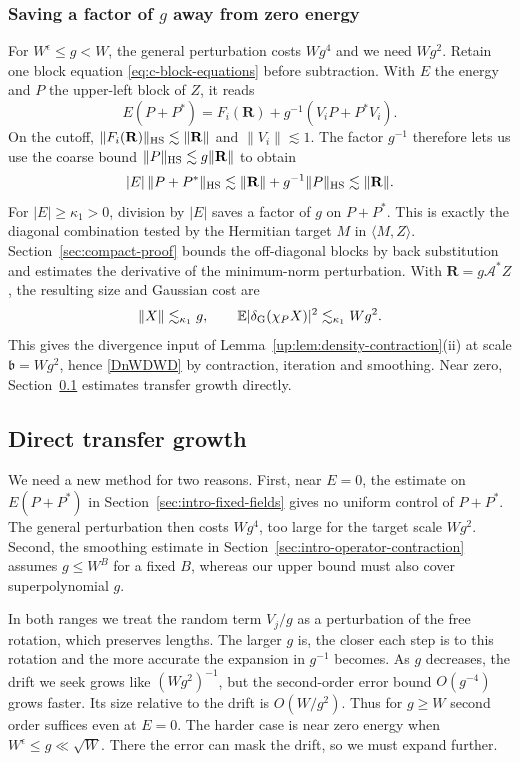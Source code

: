 \documentclass[11pt]{article}
\numberwithin{equation}{section}
\theoremstyle{remark}
\newcommand{\E}{\mathbb E}
\begin{document}
\subsubsection{Saving a factor of \texorpdfstring{$g$}{g} away from zero energy}

For $W^\epsilon\le g<W$, the general perturbation costs $Wg^4$ and we
need $Wg^2$. Retain one block equation \eqref{eq:c-block-equations}
before subtraction. With $E$ the energy and $P$ the upper-left block
of $Z$, it reads
\[
 E(P+P^*)=F_i(\mathbf R)+g^{-1}(V_iP+P^*V_i).
\]
On the cutoff, $\|F_i(\mathbf R)\|_{\rm HS}\lesssim\|\mathbf R\|$ and
$\|V_i\|\lesssim1$. The factor $g^{-1}$ therefore lets us use the
coarse bound $\|P\|_{\rm HS}\lesssim g\|\mathbf R\|$ to obtain
\[
 |E|\,\|P+P^*\|_{\rm HS}
 \lesssim \|\mathbf R\|+g^{-1}\|P\|_{\rm HS}
 \lesssim \|\mathbf R\|.
\]
For $|E|\ge\kappa_1>0$, division by $|E|$ saves a factor of $g$ on
$P+P^*$. This is exactly the diagonal combination tested by the
Hermitian target $M$ in $\langle M,Z\rangle$. Section~\ref{sec:compact-proof}
bounds the off-diagonal blocks by back substitution and estimates the
derivative of the minimum-norm perturbation. With
$\mathbf R=g\mathcal A^*Z$, the resulting size and Gaussian cost are
\[
 \|X\|\lesssim_{\kappa_1}g,\qquad
 \E|\delta_{\rm G}(\chi_P X)|^2\lesssim_{\kappa_1}Wg^2 .
\]
This gives the divergence input of Lemma~\ref{up:lem:density-contraction}\textup{(ii)}
at scale $\mathfrak b=Wg^2$, hence \eqref{DnWDWD} by contraction,
iteration and smoothing. Near zero, Section~\ref{sec:intro-direct-transfer}
estimates transfer growth directly.

\subsection{Direct transfer growth}
\label{sec:intro-direct-transfer}

We need a new method for two reasons. First, near $E=0$, the estimate
on $E(P+P^*)$ in Section~\ref{sec:intro-fixed-fields} gives no uniform
control of $P+P^*$. The general perturbation then costs $Wg^4$, too
large for the target scale $Wg^2$. Second, the smoothing estimate in
Section~\ref{sec:intro-operator-contraction} assumes $g\le W^B$ for a
fixed $B$, whereas our upper bound must also cover superpolynomial $g$.

In both ranges we treat the random term $V_j/g$ as a perturbation of
the free rotation, which preserves lengths. The larger $g$ is, the
closer each step is to this rotation and the more accurate the
expansion in $g^{-1}$ becomes. As $g$ decreases, the drift we seek
grows like $(Wg^2)^{-1}$, but the second-order error bound $O(g^{-4})$
grows faster. Its size relative to the drift is $O(W/g^2)$. Thus for
$g\ge W$ second order suffices even at $E=0$. The harder case is near
zero energy when $W^\epsilon\le g\ll\sqrt W$. There the error can mask
the drift, so we must expand further.  
\end{document}

